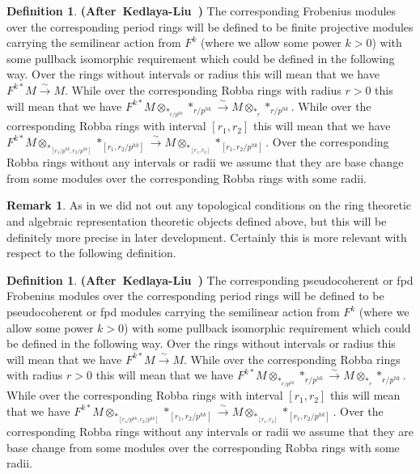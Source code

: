 \documentclass[12pt]{amsart}
\theoremstyle{definition}
\newtheorem{definition}[theorem]{Definition}
\newtheorem{remark}[theorem]{Remark}
\numberwithin{equation}{section}
\begin{document}
\begin{definition} \mbox{\bf{(After Kedlaya-Liu \cite[Definition 4.4.4]{KL2})}} The corresponding Frobenius modules over the corresponding period rings will be defined to be finite projective modules carrying the semilinear action from $F^k$ (where we allow some power $k>0$) with some pullback isomorphic requirement which could be defined in the following way. Over the rings without intervals or radius this will mean that we have $F^{k*}M\overset{\sim}{\rightarrow}M$. While over the corresponding Robba rings with radius $r>0$ this will mean that we have $F^{k*}M\otimes_{*_{r/p^{hk}}} *_{r/p^{hk}}\overset{\sim}{\rightarrow}M\otimes_{*_r}*_{r/p^{hk}}$. While over the corresponding Robba rings with interval $[r_1,r_2]$ this will mean that we have $F^{k*}M\otimes_{*_{[r_1/p^{hk},r_2/p^{hk}]}} *_{[r_1,r_2/p^{hk}]}\overset{\sim}{\rightarrow}M\otimes_{*_{[r_1,r_2]}}*_{[r_1,r_2/p^{hk}]}$. Over the corresponding Robba rings without any intervals or radii we assume that they are base change from some modules over the corresponding Robba rings with some radii. 
	
\end{definition}



\begin{remark}
As in \cite[Definition 4.4.4]{KL2} we did not out any topological conditions on the ring theoretic and algebraic representation theoretic objects defined above, but this will be definitely more precise in later development. Certainly this is more relevant with respect to the following definition.	
\end{remark}



\begin{definition} \mbox{\bf{(After Kedlaya-Liu \cite[Definition 4.4.4]{KL2})}} The corresponding pseudocoherent or fpd Frobenius modules over the corresponding period rings will be defined to be pseudocoherent or fpd modules carrying the semilinear action from $F^k$ (where we allow some power $k>0$) with some pullback isomorphic requirement which could be defined in the following way. Over the rings without intervals or radius this will mean that we have $F^{k*}M\overset{\sim}{\rightarrow}M$. While over the corresponding Robba rings with radius $r>0$ this will mean that we have $F^{k*}M\otimes_{*_{r/p^{hk}}} *_{r/p^{hk}}\overset{\sim}{\rightarrow}M\otimes_{*_r}*_{r/p^{hk}}$. While over the corresponding Robba rings with interval $[r_1,r_2]$ this will mean that we have $F^{k*}M\otimes_{*_{[r_1/p^{hk},r_2/p^{hk}]}} *_{[r_1,r_2/p^{hk}]}\overset{\sim}{\rightarrow}M\otimes_{*_{[r_1,r_2]}}*_{[r_1,r_2/p^{hk}]}$. Over the corresponding Robba rings without any intervals or radii we assume that they are base change from some modules over the corresponding Robba rings with some radii. 
	
\end{definition}
\end{document}
